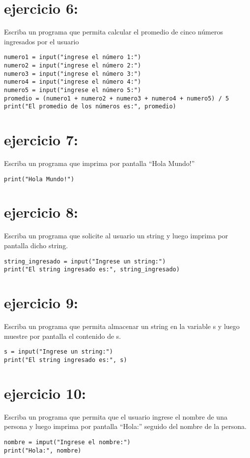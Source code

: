 \documentclass[11pt]{article}
\begin{document}
\section{ejercicio 6:}
\label{sec:orgf6b44b0}
Escriba un programa que permita calcular el promedio de cinco
números ingresados por el usuario
\begin{verbatim}
numero1 = input("ingrese el número 1:")
numero2 = input("ingrese el número 2:")
numero3 = input("ingrese el número 3:")
numero4 = input("ingrese el número 4:")
numero5 = input("ingrese el número 5:")
promedio = (numero1 + numero2 + numero3 + numero4 + numero5) / 5
print("El promedio de los números es:", promedio)
\end{verbatim}
\section{ejercicio 7:}
\label{sec:org60ad9a9}
Escriba un programa que imprima por pantalla “Hola Mundo!”
\begin{verbatim}
print("Hola Mundo!")
\end{verbatim}
\section{ejercicio 8:}
\label{sec:org221a617}
Escriba un programa que solicite al usuario un string y luego
imprima por pantalla dicho string.
\begin{verbatim}
string_ingresado = input("Ingrese un string:")
print("El string ingresado es:", string_ingresado)
\end{verbatim}
\section{ejercicio 9:}
\label{sec:org9b8115e}
Escriba un programa que permita almacenar un string en la
variable s y luego muestre por pantalla el contenido de s.
\begin{verbatim}
s = input("Ingrese un string:")
print("El string ingresado es:", s)
\end{verbatim}
\section{ejercicio 10:}
\label{sec:org174fc90}
Escriba un programa que permita que el usuario ingrese el
nombre de una persona y luego imprima por pantalla “Hola:” seguido
del nombre de la persona.
\begin{verbatim}
nombre = imput("Ingrese el nombre:")
print("Hola:", nombre)
\end{verbatim}
\end{document}
